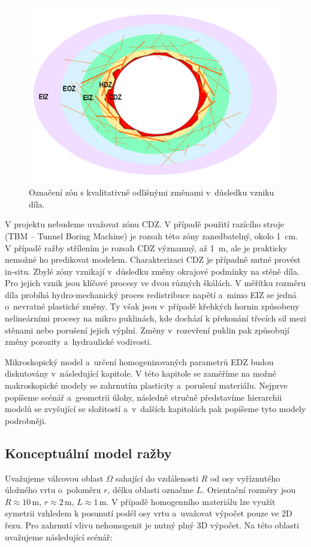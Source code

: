 \documentclass{article}
\begin{document}
\begin{figure}
    \centering
    \includegraphics[width=\textwidth]{graphics/EDZ_structure.pdf}
    \caption{Označení zón s kvalitativně odlišnými změnami v~důsledku vzniku díla.}
    \label{fig:edz_zones}
\end{figure}

V projektu nebudeme uvažovat zónu CDZ. V případě použití razícího stroje (TBM -- Tunnel Boring Machine) je rozsah této zóny zanedbatelný, okolo 1~cm. V případě 
ražby střílením je rozsah CDZ významný, až 1~m, ale je prakticky nemožné ho predikovat modelem. Charakterizaci CDZ je případně nutné provést in-situ.
Zbylé zóny vznikají v~důsledku změny okrajové podmínky na stěně díla. Pro jejich vznik jsou klíčové procesy ve dvou různých škálách. V měřítku rozměru 
díla probíhá hydro-mechanický proces redistribuce napětí a~mimo EIZ se jedná o~nevratné plastické změny. Ty však jsou v~případě křehkých hornin
způsobeny nelineárními procesy na mikro puklinách, kde dochází k překonání třecích sil mezi stěnami nebo porušení jejich výplní. 
Změny v~rozevření puklin pak způsobují změny porozity a~hydraulické vodivosti. 

Mikroskopický model a~určení homogenizovaných parametrů EDZ budou diskutovány v~následující kapitole.
V této kapitole se zaměříme na možné makroskopické modely se zahrnutím plasticity a~porušení materiálu.
Nejprve popíšeme scénář a~geometrii úlohy, následně stručně představíme hierarchii modelů se zvyšující se složitostí
a~v~dalších kapitolách pak popíšeme tyto modely podrobněji.

\subsection{Konceptuální model ražby}
Uvažujeme válcovou oblast $\Omega$ sahající do vzdálenosti $R$ od osy vyříznutého úložného vrtu o~poloměru $r$, délku oblasti označme $L$. Orientační rozměry jsou $R\approx 10\,\mathrm{m}$, $r\approx 2\,\mathrm{m}$, $L\approx 1\,\mathrm{m}$. V případě homogenního materiálu lze využít symetrii vzhledem k posunutí podél osy vrtu a~uvažovat výpočet pouze ve 2D řezu. Pro zahrnutí vlivu nehomogenit je nutný plný 3D výpočet. Na této oblasti uvažujeme následující scénář:
\end{document}
